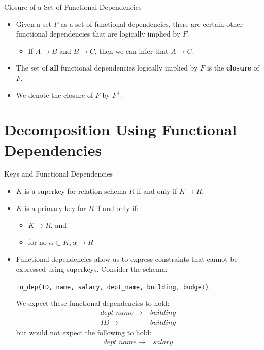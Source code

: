 \documentclass[aspectratio=169]{beamer}
\begin{document}
\begin{frame}{Closure of a Set of Functional Dependencies}
    \begin{itemize}
        \item Given a set $F$ as a set of functional dependencies, there are certain other functional dependencies that are logically implied by $F$.
        \begin{itemize}
            \item If $A \rightarrow B$ and $B \rightarrow C$, then we can infer that $A \rightarrow C$.
        \end{itemize}
        \item The set of \textbf{all} functional dependencies logically implied by $F$ is the \textbf{closure} of $F$.
        \item We denote the closure of $F$ by $F^+$.
    \end{itemize}
\end{frame}

\section{Decomposition Using Functional Dependencies}

\begin{frame}{Keys and Functional Dependencies}
    \begin{itemize}
        \item $K$ is a superkey for relation schema $R$ if and only if $K \rightarrow R$.
        \item $K$ is a primary key for $R$ if and only if:
        \begin{itemize}
            \item $K \rightarrow R$, and
            \item for no $\alpha \subset K, \alpha \rightarrow R$
        \end{itemize}
        \item Functional dependencies allow us to express constraints that cannot be expressed using superkeys. Consider the schema:
            \begin{center}
                \texttt{\footnotesize in\_dep(ID, name, salary, dept\_name, building, budget)}.
            \end{center}
        We expect these functional dependencies to hold:
            \begin{equation*}
                \begin{align*}
                    dept\_name \rightarrow& building \\
                    ID \rightarrow& building
                \end{align*}
            \end{equation*}
        but would not expect the following to hold:
            \begin{equation*}
                \begin{align*}
                    dept\_name \rightarrow& salary
                \end{align*}
            \end{equation*}
    \end{itemize}
\end{frame}
\end{document}
